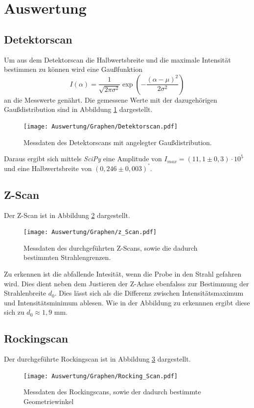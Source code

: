 \section{Auswertung}
\label{sec:Auswertung}

\subsection{Detektorscan}
 Um aus dem Detektorscan die Halbwertsbreite
 und die maximale Intensität bestimmen zu können wird eine Gaußfunktion
 \begin{equation}
     I(\alpha) = \frac{1}{\sqrt{2\pi \sigma^2}}\exp\left(-\frac{(\alpha - \mu)^2}{2\sigma^2}\right)
 \end{equation} 
an die Messwerte genährt.
Die gemessene Werte mit der dazugehörigen Gaußdistribution sind in Abbildung \ref{fig:gauß} dargestellt.
\begin{figure}[ht]
    \centering
    \texttt{[image: Auswertung/Graphen/Detektorscan.pdf]}
    \caption{Messdaten des Detektorscans mit angelegter Gaußdistribution.}
    \label{fig:gauß}
\end{figure}
Daraus ergibt sich mittels \textit{SciPy} \cite{scipy} eine Amplitude  von $I_{max} =(11,1\pm 0,3) \cdot 10^5$ 
und eine Halbwertsbreite von $(0,246 \pm 0,003)^°$.



\subsection{Z-Scan}
Der Z-Scan ist in Abbildung \ref{fig:Z} dargestellt.
\begin{figure}[h]
    \centering
    \texttt{[image: Auswertung/Graphen/z\_Scan.pdf]}
    \caption{Messdaten des durchgeführten Z-Scans, sowie die dadurch bestimmten Strahlengrenzen.}
    \label{fig:Z}
\end{figure}
Zu erkennen ist die abfallende Intesität, wenn die Probe in den Strahl gefahren wird.
Dies dient neben dem Justieren der Z-Achse ebenfalsss zur Bestimmung der Strahlenbreite $d_0$.
Dies lässt sich als die Differenz zwischen Intensitätsmaximum und Intensitätsminimum ablesen.
Wie in der Abbildung zu erkennnen ergibt diese sich zu $d_0 \approx 1,9$ mm.



\subsection{Rockingscan}
Der durchgeführte Rockingscan ist in Abbildung \ref{fig:roc} dargestellt.
\begin{figure}[h]
    \centering
    \texttt{[image: Auswertung/Graphen/Rocking\_Scan.pdf]}
    \caption{Messdaten des Rockingscans, sowie der dadurch bestimmte Geometriewinkel}
    \label{fig:roc}
\end{figure}

